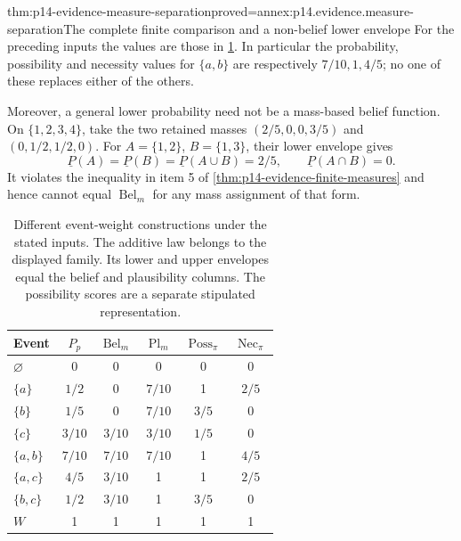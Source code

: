 \begin{hbtheorem}{thm:p14-evidence-measure-separation}{proved=annex:p14.evidence.measure-separation}{The complete finite comparison and a non-belief lower envelope}
For the preceding inputs the values are those in
\cref{tab:p14-evidence-eight-events}. In particular the probability,
possibility and necessity values for \(\{a,b\}\) are respectively
\(7/10,1,4/5\); no one of these replaces either of the others.

Moreover, a general lower probability need not be a mass-based belief
function. On \(\{1,2,3,4\}\), take the two retained masses
\((2/5,0,0,3/5)\) and \((0,1/2,1/2,0)\).
For \(A=\{1,2\}\), \(B=\{1,3\}\), their lower envelope gives
\[
 \underline P(A)=\underline P(B)=\underline P(A\cup B)=2/5,
 \qquad \underline P(A\cap B)=0.
\]
It violates the inequality in item 5 of
\cref{thm:p14-evidence-finite-measures} and hence cannot equal
\(\operatorname{Bel}_m\) for any mass assignment of that form.
\end{hbtheorem}

\begin{table}[htbp]
\centering\small
\begin{tabular}{@{}lccccc@{}}
\toprule
Event & \(P_p\) & \(\operatorname{Bel}_m\) &
\(\operatorname{Pl}_m\) &
\(\operatorname{Poss}_{\pi}\) & \(\operatorname{Nec}_{\pi}\) \\
\midrule
\(\varnothing\) & 0 & 0 & 0 & 0 & 0 \\
\(\{a\}\) & \(1/2\) & 0 & \(7/10\) & 1 & \(2/5\) \\
\(\{b\}\) & \(1/5\) & 0 & \(7/10\) & \(3/5\) & 0 \\
\(\{c\}\) & \(3/10\) & \(3/10\) & \(3/10\) & \(1/5\) & 0 \\
\(\{a,b\}\) & \(7/10\) & \(7/10\) & \(7/10\) & 1 & \(4/5\) \\
\(\{a,c\}\) & \(4/5\) & \(3/10\) & 1 & 1 & \(2/5\) \\
\(\{b,c\}\) & \(1/2\) & \(3/10\) & 1 & \(3/5\) & 0 \\
\(W\) & 1 & 1 & 1 & 1 & 1 \\
\bottomrule
\end{tabular}
\caption{Different event-weight constructions under the stated inputs.
The additive law belongs to the displayed family. Its lower and upper
envelopes equal the belief and plausibility columns. The possibility scores
are a separate stipulated representation.}
\label{tab:p14-evidence-eight-events}
\end{table}

